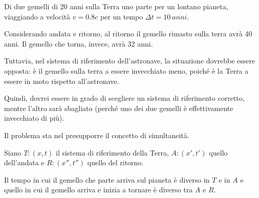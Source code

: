 Di due gemelli di 20 anni sulla Terra uno parte per un lontano pianeta, viaggiando a velocità $v = 0.8 c$ per un tempo $\Delta t = \qty{10}{anni}$.

Considerando andata e ritorno, al ritorno il gemello rimasto sulla terra avrà 40 anni.
Il gemello che torna, invece, avrà 32 anni.

Tuttavia, nel sistema di riferimento dell'astronave, la situazione dovrebbe essere opposta: è il gemello sulla terra a essere invecchiato meno, poiché è la Terra a essere in moto rispetto all'astronave.

Quindi, dovrei essere in grado di scegliere un sistema di riferimento corretto, mentre l'altro sarà sbagliato (perché uno dei due gemelli è effettivamente invecchiato di più).

Il problema sta nel presupporre il concetto di simultaneità.

Siano $T: (x, t)$ il sistema di riferimento della Terra, $A: (x', t')$ quello dell'andata e $R: (x'', t'')$ quello del ritorno.

Il tempo in cui il gemello che parte arriva sul pianeta è diverso in $T$ e in $A$ e quello in cui il gemello arriva e inizia a tornare è diverso tra $A$ e $R$.
